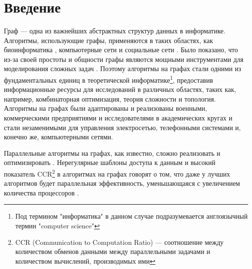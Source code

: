 \documentclass[14pt]{matmex-diploma-custom}
\begin{document}
\maketitle
\tableofcontents

\section*{Введение}
\paragraph{} Граф --- одна из важнейших абстрактных структур данных в информатике. Алгоритмы, использующие графы, применяются в таких областях, как биоинформатика \cite{Georganas}, компьютерные сети и социальные сети \cite{Riedy}. Было показано, что из-за своей простоты и общности графы являются мощными инструментами для моделирования сложных задач \cite{Bergamini}. Поэтому алгоритмы на графах стали одними из фундаментальных единиц в теоретической информатике\footnote{Под термином "информатика" в данном случае подразумевается англоязычный термин "computer science"}, предоставив информационные ресурсы для исследований в различных областях, таких как, например, комбинаторная оптимизация, теория сложности и топология. Алгоритмы на графах были адаптированы и реализованы военными, коммерческими предприятиями и исследователями в академических кругах и стали незаменимыми для управления электросетью, телефонными системами и, конечно же, компьютерными сетями.

Параллельные алгоритмы на графах, как известно, сложно реализовать и оптимизировать \cite{Ediger}. Нерегулярные шаблоны доступа к данным и высокий показатель CCR\footnote{CCR (Communication to Computation Ratio) --- соотношение между количеством обменов данными между параллельными задачами и количеством вычислений, производимых ими} в алгоритмах на графах говорят о том, что даже у лучших алгоритмов будет параллельная эффективность, уменьшающаяся с увеличением количества процессоров \cite{Azad}.
\end{document}

